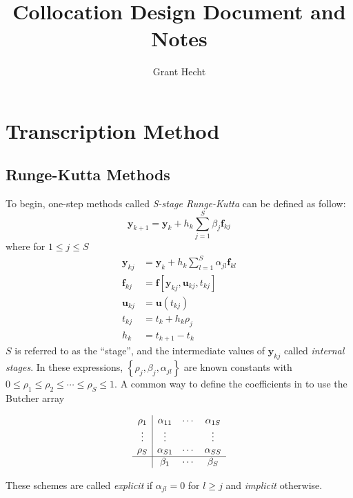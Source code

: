 \documentclass[]{article}
\title{Collocation Design Document and Notes}
\author{Grant Hecht}
\begin{document}
\maketitle

\section{Transcription Method}
\subsection{Runge-Kutta Methods}
To begin, one-step methods called \textit{S-stage Runge-Kutta} can be defined as follow:
\begin{equation}
    \mathbf{y}_{k+1} = \mathbf{y}_k + h_k\sum_{j=1}^S \beta_j \mathbf{f}_{kj}
\end{equation}
where for $1 \leq j \leq S$
\begin{align}
    \mathbf{y}_{kj} &= \mathbf{y}_k + h_k \sum_{l=1}^S \alpha_{jl}\mathbf{f}_{kl} \\ 
    \mathbf{f}_{kj} &= \mathbf{f}\left[\mathbf{y}_{kj},\mathbf{u}_{kj},t_{kj}\right] \\ 
    \mathbf{u}_{kj} &= \mathbf{u}(t_{kj}) \\ 
    t_{kj} &= t_k + h_k \rho_j \\ 
    h_k &= t_{k+1} - t_k
\end{align}
$S$ is referred to as the ``stage'', and the intermediate values of $\mathbf{y}_{kj}$ called \textit{internal stages}. In these expressions, $\left\{\rho_j, \beta_j, \alpha_{jl}\right\}$ are known constants with $0\leq\rho_1\leq\rho_2\leq\cdots\leq\rho_S\leq1$. A common way to define the coefficients in to use the Butcher array 

\[
\begin{array}
{c|cccc}
\rho_1 & \alpha_{11} & \cdots & \alpha_{1S} \\
\vdots & \vdots & & \vdots \\
\rho_S & \alpha_{S1} & \cdots & \alpha_{SS} \\
\hline
& \beta_1 & \cdots & \beta_S
\end{array}
\]

\noindent These schemes are called \textit{explicit} if $\alpha_{jl}=0$ for $l\geq j$ and \textit{implicit} otherwise.
\end{document}
